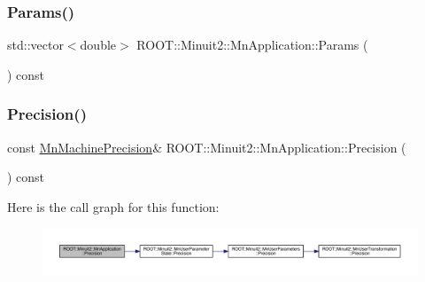 \subsubsection{\texorpdfstring{Params()}{Params()}\hspace{0.1cm}{\footnotesize\ttfamily [2/2]}}
{\footnotesize\ttfamily std\+::vector$<$double$>$ R\+O\+O\+T\+::\+Minuit2\+::\+Mn\+Application\+::\+Params (\begin{DoxyParamCaption}{ }\end{DoxyParamCaption}) const}

\mbox{\label{classROOT_1_1Minuit2_1_1MnApplication_a8de6eb3be52721cec183ba830504e7bc}} 
\subsubsection{\texorpdfstring{Precision()}{Precision()}\hspace{0.1cm}{\footnotesize\ttfamily [1/2]}}
{\footnotesize\ttfamily const \mbox{\hyperlink{classROOT_1_1Minuit2_1_1MnMachinePrecision}{Mn\+Machine\+Precision}}\& R\+O\+O\+T\+::\+Minuit2\+::\+Mn\+Application\+::\+Precision (\begin{DoxyParamCaption}{ }\end{DoxyParamCaption}) const\hspace{0.3cm}{\ttfamily [inline]}}

Here is the call graph for this function\+:
\nopagebreak
\begin{figure}[H]
\begin{center}
\leavevmode
\includegraphics[width=350pt]{df/dd5/classROOT_1_1Minuit2_1_1MnApplication_a8de6eb3be52721cec183ba830504e7bc_cgraph}
\end{center}
\end{figure}
\mbox{\label{classROOT_1_1Minuit2_1_1MnApplication_a8de6eb3be52721cec183ba830504e7bc}} 
